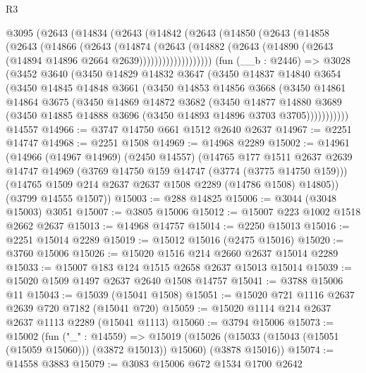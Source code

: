 \begin{lexlean}{R3}
\begin{coremodule}
    @3095
      (@2643
        (@14834
          (@2643
            (@14842
              (@2643
                (@14850
                  (@2643
                    (@14858
                      (@2643
                        (@14866
                          (@2643
                            (@14874
                              (@2643
                                (@14882
                                  (@2643
                                    (@14890 (@2643 (@14894 @14896 @2664 @2639)))))))))))))))))))
    (fun (__b : @2446) =>
    @3028
      (@3452
        @3640
        (@3450
          @14829
          @14832
          @3647
          (@3450
            @14837
            @14840
            @3654
            (@3450
              @14845
              @14848
              @3661
              (@3450
                @14853
                @14856
                @3668
                (@3450
                  @14861
                  @14864
                  @3675
                  (@3450
                    @14869
                    @14872
                    @3682
                    (@3450
                      @14877
                      @14880
                      @3689
                      (@3450 @14885 @14888 @3696 (@3450 @14893 @14896 @3703 @3705)))))))))))
    @14557
@14966 := @3747 @14750 @661 @1512 @2640 @2637
@14967 := @2251 @14747
@14968 := @2251 @1508
@14969 := @14968 @2289
@15002 := @14961
    (@14966
      (@14967 @14969)
      (@2450 @14557)
      (@14765
        @177
        @1511
        @2637
        @2639
        @14747
        @14969
        (@3769 @14750 @159 @14747 (@3774 (@3775 @14750 @159)))
        (@14765 @1509 @214 @2637 @2637 @1508 @2289 (@14786 @1508) @14805))
      (@3799 @14555 @1507))
@15003 := @288 @14825
@15006 := @3044 (@3048 @15003) @3051
@15007 := @3805 @15006
@15012 := @15007 @223 @1002 @1518 @2662 @2637
@15013 := @14968 @14757
@15014 := @2250 @15013
@15016 := @2251 @15014 @2289
@15019 := @15012 @15016 (@2475 @15016)
@15020 := @3760 @15006
@15026 := @15020 @1516 @214 @2660 @2637 @15014 @2289
@15033 := @15007 @183 @124 @1515 @2658 @2637 @15013 @15014
@15039 := @15020 @1509 @1497 @2637 @2640 @1508 @14757
@15041 := @3788 @15006 @11
@15043 := @15039 (@15041 @1508)
@15051 := @15020 @721 @1116 @2637 @2639 @720 @7182 (@15041 @720)
@15059 := @15020 @1114 @214 @2637 @2637 @1113 @2289 (@15041 @1113)
@15060 := @3794 @15006
@15073 := @15002
    (fun ("_" : @14559) =>
    @15019 (@15026 (@15033 (@15043 (@15051 (@15059 @15060))) (@3872 @15013)) @15060) (@3878 @15016))
@15074 := @14558 @3883
@15079 := @3083 @15006 @672 @1534 @1700 @2642

\end{coremodule}
\end{lexlean}
